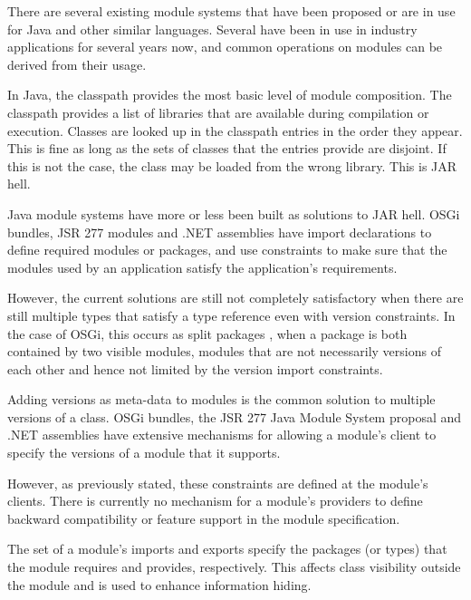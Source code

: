 There are several existing module systems that have been proposed or
are in use for Java and other similar languages. 
Several \cite{javajars, OSGi4, netassemblies} have been in use in industry 
applications for several years now, and common operations on modules
can be derived from their usage.


In Java, the classpath provides the most basic level of module composition. 
The classpath provides a list of libraries that are
available during compilation or execution. Classes are looked up in the 
classpath entries in the order they appear. This is fine as long as the sets 
of classes that the entries provide are disjoint. If this is not the case, the class may
be loaded from the wrong library. This is JAR hell.

Java module systems have more or less been built as solutions to JAR hell. 
OSGi \cite{OSGi4} bundles, JSR 277 modules \cite{JSR277} and .NET assemblies \cite{netassemblies}
have import declarations to define required modules or packages, and use constraints 
to make sure that the modules used by an application satisfy the 
application's requirements. 

However, the current solutions are still not completely satisfactory when there are still multiple
types that satisfy a type reference even with version constraints. In the case
of OSGi, this occurs as split packages \cite{iJAMComments}, when a package is both contained by
two visible modules, modules that are not necessarily versions of each other
and hence not limited by the version import constraints.

Adding versions as meta-data to modules is the common solution to multiple
versions of a class. OSGi bundles, the JSR 277 Java Module System
proposal and .NET assemblies have extensive mechanisms for allowing a 
module's client to specify the versions of a module that it supports.

However, as previously stated, these constraints are defined at the module's
clients. There is currently no mechanism for a module's providers to define
backward compatibility or feature support in the module specification.


The set of a module's imports and exports specify the packages (or types) that
the module requires and provides, respectively. This affects class
visibility outside the module and is used to enhance information hiding. 

